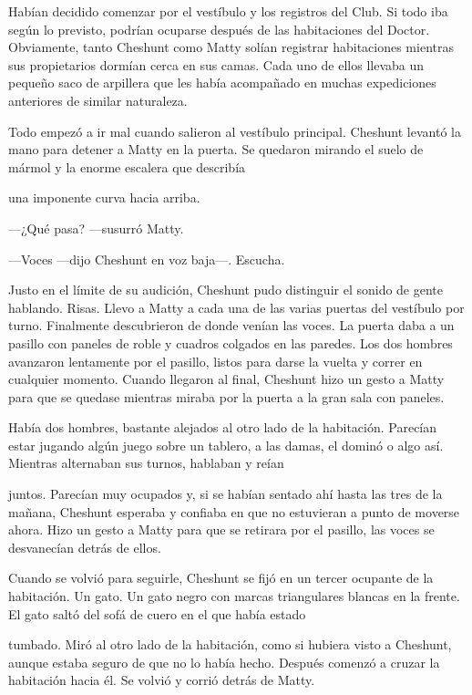 {Habían decidido comenzar por el vestíbulo y los registros del Club. Si
	todo iba según lo previsto, podrían ocuparse después de las habitaciones
	del Doctor. Obviamente, tanto Cheshunt como Matty solían registrar
	habitaciones mientras sus propietarios dormían cerca en sus camas. Cada
	uno de ellos llevaba un pequeño saco de arpillera que les había
acompañado en muchas expediciones anteriores de similar naturaleza.}

{Todo empezó a ir mal cuando salieron al vestíbulo principal. Cheshunt
	levantó la mano para detener a Matty en la puerta. Se quedaron mirando
el suelo de mármol y la enorme escalera que describía}

{una imponente curva hacia arriba.}

{---¿Qué pasa? ---susurró Matty.}

{---Voces ---dijo Cheshunt en voz baja---. Escucha.}

{Justo en el límite de su audición, Cheshunt pudo distinguir el sonido
	de gente hablando. Risas. Llevo a Matty a cada una de las varias puertas
	del vestíbulo por turno. Finalmente descubrieron de donde venían las
	voces. La puerta daba a un pasillo con paneles de roble y cuadros
	colgados en las paredes. Los dos hombres avanzaron lentamente por el
	pasillo, listos para darse la vuelta y correr en cualquier momento.
	Cuando llegaron al final, Cheshunt hizo un gesto a Matty para que se
quedase mientras miraba por la puerta a la gran sala con paneles.}

{Había dos hombres, bastante alejados al otro lado de la habitación.
	Parecían estar jugando algún juego sobre un tablero, a las damas, el
dominó o algo así. Mientras alternaban sus turnos, hablaban y reían}

{juntos. Parecían muy ocupados y, si se habían sentado ahí hasta las
	tres de la mañana, Cheshunt esperaba y confiaba en que no estuvieran a
	punto de moverse ahora. Hizo un gesto a Matty para que se retirara por
el pasillo, las voces se desvanecían detrás de ellos.}

{Cuando se volvió para seguirle, Cheshunt se fijó en un tercer ocupante
	de la habitación. Un gato. Un gato negro con marcas triangulares blancas
en la frente. El gato saltó del sofá de cuero en el que había estado}

{tumbado. Miró al otro lado de la habitación, como si hubiera visto a
	Cheshunt, aunque estaba seguro de que no lo había hecho. Después comenzó
a cruzar la habitación hacia él. Se volvió y corrió detrás de Matty.}

